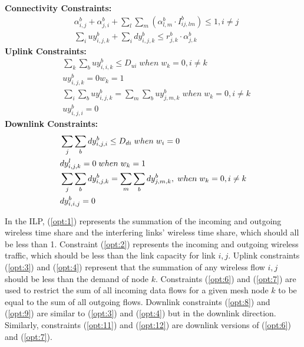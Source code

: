 \noindent
{\bf Connectivity Constraints:}
\begin{align}
\label{opt:1}
& \alpha_{i,j}^b + \alpha_{j,i}^b + \sum_l\sum_m(\alpha_{l,m}^b \cdot I_{ij,lm}^b) \leq 1, i\neq j \\
\label{opt:2}
& \sum_i uy_{i,j,k}^b + \sum_i dy_{i,j,k}^b \leq r_{j,k}^b \cdot \alpha_{j,k}^b 
\end{align}
\noindent
{\bf Uplink Constraints:} 
\begin{align}
\label{opt:3}
& \sum_k \sum_b uy_{i,i,k}^b \leq D_{ui} \; when \; w_k=0, i \neq k \\
\label{opt:4}
& uy_{i,j,k}^b = 0 w_k=1 \\
\label{opt:6}
& \sum_i\sum_b uy_{i,j,k}^b = \sum_m \sum_b uy_{j,m,k}^b \; when \; w_k=0, i \neq k\\
\label{opt:7}
& uy_{i,j,i}^b=0 
\end{align}
\noindent
{\bf Downlink Constraints:} 
\begin{align}
{\bf}
\label{opt:8}
& \sum_j \sum_b dy_{i,j,i}^b \leq D_{di} \; when \; w_i=0 \\
\label{opt:9}
& dy_{i,j,k}^l =0 \; when \; w_k=1 \\
\label{opt:11}
& \sum_j\sum_b dy_{i,j,k}^b = \sum_m \sum_b dy_{j,m,k}^b,\; when \; w_k=0,  i \neq k \\
\label{opt:12}
& dy_{i,i,j}^b=0
\end{align}

In the ILP, (\ref{opt:1}) represents the summation of the incoming and outgoing 
wireless time share and the interfering links' wireless time share, which should all be less than 1.
Constraint (\ref{opt:2}) represents the incoming and outgoing wireless traffic, which 
should be less than the link capacity for link $i,j$. Uplink constraints (\ref{opt:3})
and (\ref{opt:4}) represent that the summation of any wireless flow $i,j$ should be less than
the demand of node $k$.  Constraints (\ref{opt:6}) and (\ref{opt:7}) are used to restrict
the sum of all incoming data flows for a given mesh node $k$ to be equal to the 
sum of all outgoing flows. Downlink constraints (\ref{opt:8}) and (\ref{opt:9}) are
similar to (\ref{opt:3}) and (\ref{opt:4}) but in the downlink direction.  Similarly,
constraints (\ref{opt:11}) and (\ref{opt:12}) are downlink versions of (\ref{opt:6}) and (\ref{opt:7}).

